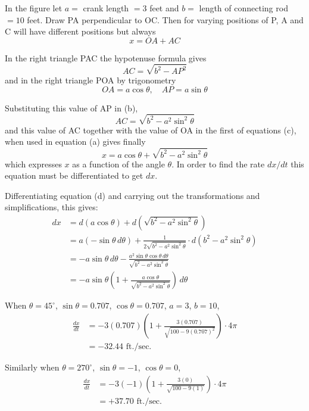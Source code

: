 In the figure let $a=$ crank length $=3$ feet and $b=$ length of connecting rod $=10$ feet. Draw PA perpendicular to OC. Then for varying positions of P, A and C will have different positions but always
\begin{equation}
x=OA+AC \tag{a}
\end{equation}

In the right triangle PAC the hypotenuse formula gives
\begin{equation}
AC=\sqrt{b^2-AP^2} \tag{b}
\end{equation}
and in the right triangle POA by trigonometry
\begin{equation}
OA=a\cos\theta,\quad AP=a\sin\theta \tag{c}
\end{equation}

Substituting this value of AP in (b),
\begin{equation*}
AC=\sqrt{b^2-a^2\sin^2\theta}
\end{equation*}
and this value of AC together with the value of OA in the first of equations (c), when used in equation (a) gives finally
\begin{equation}
x=a\cos\theta+\sqrt{b^2-a^2\sin^2\theta} \tag{d}
\end{equation}
which expresses $x$ as a function of the angle $\theta$. In order to find the rate $dx/dt$ this equation must be differentiated to get $dx$.

Differentiating equation (d) and carrying out the transformations and simplifications, this gives:
\begin{align*}
dx &= d(a\cos\theta)+d(\sqrt{b^2-a^2\sin^2\theta}) \\
&= a(-\sin\theta\,d\theta)+\frac{1}{2\sqrt{b^2-a^2\sin^2\theta}}\cdot d(b^2-a^2\sin^2\theta) \\
&= -a\sin\theta\,d\theta-\frac{a^2\sin\theta\cos\theta\,d\theta}{\sqrt{b^2-a^2\sin^2\theta}} \\
&= -a\sin\theta\left(1+\frac{a\cos\theta}{\sqrt{b^2-a^2\sin^2\theta}}\right)\,d\theta
\end{align*}

When $\theta=45^\circ$, $\sin\theta=0.707$, $\cos\theta=0.707$, $a=3$, $b=10$,
\begin{align*}
\frac{dx}{dt} &= -3(0.707)\left(1+\frac{3(0.707)}{\sqrt{100-9(0.707)^2}}\right)\cdot 4\pi \\
&= -32.44\text{ ft./sec.}
\end{align*}

Similarly when $\theta=270^\circ$, $\sin\theta=-1$, $\cos\theta=0$,
\begin{align*}
\frac{dx}{dt} &= -3(-1)\left(1+\frac{3(0)}{\sqrt{100-9(1)}}\right)\cdot 4\pi \\
&= +37.70\text{ ft./sec.}
\end{align*}

